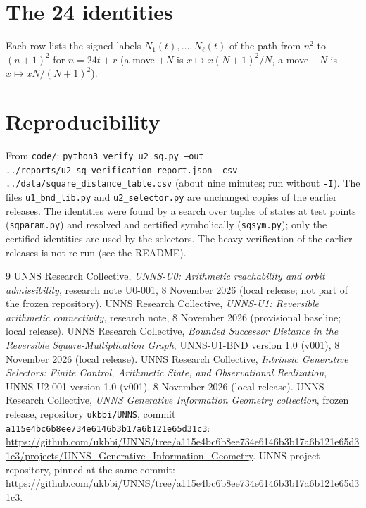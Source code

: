 \documentclass[11pt]{article}
\theoremstyle{definition}
\begin{document}
\appendix
\section{The 24 identities}\label{app:ids}
Each row lists the signed labels $N_1(t),\dots,N_\ell(t)$ of the path from $n^2$ to $(n+1)^2$ for $n=24t+r$ (a move $+N$ is $x\mapsto x(N+1)^2/N$, a move $-N$ is $x\mapsto xN/(N+1)^2$).


\section{Reproducibility}
From \texttt{code/}: \texttt{python3 verify\_u2\_sq.py --out ../reports/u2\_sq\_verification\_report.json --csv ../data/square\_distance\_table.csv} (about nine minutes; run without \texttt{-I}).
The files \texttt{u1\_bnd\_lib.py} and \texttt{u2\_selector.py} are unchanged copies of the earlier releases. The identities were found by a search over tuples of states at test points (\texttt{sqparam.py}) and resolved and certified symbolically (\texttt{sqsym.py});
only the certified identities are used by the selectors. The heavy verification of the earlier releases is not re-run (see the README).

\begin{thebibliography}{9}
 UNNS Research Collective, \emph{UNNS-U0: Arithmetic reachability and orbit admissibility}, research note U0-001, 8 November 2026 (local release; not part of the frozen repository).
 UNNS Research Collective, \emph{UNNS-U1: Reversible arithmetic connectivity}, research note, 8 November 2026 (provisional baseline; local release).
 UNNS Research Collective, \emph{Bounded Successor Distance in the Reversible Square-Multiplication Graph}, UNNS-U1-BND version 1.0 (v001), 8 November 2026 (local release).
 UNNS Research Collective, \emph{Intrinsic Generative Selectors: Finite Control, Arithmetic State, and Observational Realization}, UNNS-U2-001 version 1.0 (v001), 8 November 2026 (local release).
 UNNS Research Collective, \emph{UNNS Generative Information Geometry collection}, frozen release, repository \texttt{ukbbi/UNNS}, commit \texttt{a115e4bc6b8ee734e6146b3b17a6b121e65d31c3}:
\url{https://github.com/ukbbi/UNNS/tree/a115e4bc6b8ee734e6146b3b17a6b121e65d31c3/projects/UNNS_Generative_Information_Geometry}.
 UNNS project repository, pinned at the same commit:
\url{https://github.com/ukbbi/UNNS/tree/a115e4bc6b8ee734e6146b3b17a6b121e65d31c3}.
\end{thebibliography}
\end{document}
